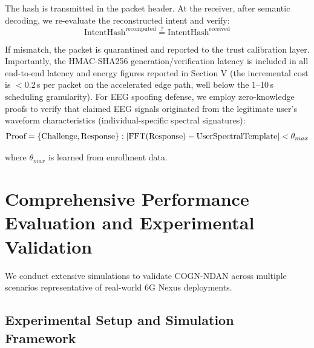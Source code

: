 \documentclass[journal]{IEEEtran}
\newcommand{\COGN}{COGN-NDAN}
\begin{document}
The hash is transmitted in the packet header. At the receiver, after semantic decoding, we re-evaluate the reconstructed intent and verify:
\begin{equation}
    \text{IntentHash}^{\text{recomputed}} \stackrel{?}{=} \text{IntentHash}^{\text{received}}
\end{equation}

If mismatch, the packet is quarantined and reported to the trust calibration layer. Importantly, the HMAC-SHA256 generation/verification latency is included in all end-to-end latency and energy figures reported in Section V (the incremental cost is $<$0.2\,\textmu s per packet on the accelerated edge path, well below the 1--10\,\textmu s scheduling granularity). For EEG spoofing defense, we employ zero-knowledge proofs to verify that claimed EEG signals originated from the legitimate user's waveform characteristics (individual-specific spectral signatures):
\begin{equation}
    \text{Proof} = \{\text{Challenge}, \text{Response}\}: \\ |\text{FFT}(\text{Response}) - \text{UserSpectralTemplate}| < \theta_{max}
\end{equation}

where $\theta_{max}$ is learned from enrollment data.

\section{Comprehensive Performance Evaluation and Experimental Validation}

We conduct extensive simulations to validate \COGN{} across multiple scenarios representative of real-world 6G Nexus deployments.

\subsection{Experimental Setup and Simulation Framework}
\end{document}
